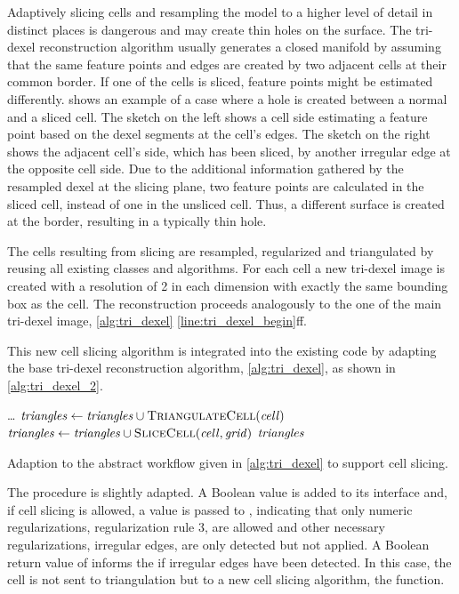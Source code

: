 Adaptively slicing cells and resampling the model to a higher level of detail in distinct places is dangerous and may create thin holes on the surface.
The tri-dexel reconstruction algorithm usually generates a closed manifold by assuming that the same feature points and edges are created by two adjacent cells at their common border.
If one of the cells is sliced, feature points might be estimated differently.
 shows an example of a case where a hole is created between a normal and a sliced cell.
The sketch on the left shows a cell side estimating a feature point based on the dexel segments at the cell's edges.
The sketch on the right shows the adjacent cell's side, which has been sliced, \eg by another irregular edge at the opposite cell side.
Due to the additional information gathered by the resampled dexel at the slicing plane, two feature points are calculated in the sliced cell, instead of one in the unsliced cell.
Thus, a different surface is created at the border, resulting in a typically thin hole.

The cells resulting from slicing are resampled, regularized and triangulated by reusing all existing classes and algorithms.
For each cell a new tri-dexel image is created with a resolution of 2 in each dimension with exactly the same bounding box as the cell.
The reconstruction proceeds analogously to the one of the main tri-dexel image, \cf \cref{alg:tri_dexel} \cref{line:tri_dexel_begin}ff.

This new cell slicing algorithm is integrated into the existing code by adapting the base tri-dexel reconstruction algorithm, \cref{alg:tri_dexel}, as shown in \cref{alg:tri_dexel_2}.
%
\begin{algorithm}
	\centering
	\begin{algorithmic}[1]
		\hfill\break
			\hspace*{\dimexpr\algorithmicindent*1}\dots
					\State $\var{triangles} \gets \var{triangles} \cup \Call{TriangulateCell}{\var{cell}}$
				\Else
					\State $\var{triangles} \gets \var{triangles} \cup \Call{SliceCell}{\var{cell}, \var{grid}}$
				\EndIf
			\EndFor
			\State \Return $\mathit{triangles}$
		\EndFunction
	\end{algorithmic}
	\caption{
		Adaption to the abstract workflow given in \cref{alg:tri_dexel} to support cell slicing.
	}
	\label{alg:tri_dexel_2}
\end{algorithm}
%
The  procedure is slightly adapted.
A Boolean value is added to its interface and, if cell slicing is allowed, a value \True is passed to , indicating that only numeric regularizations, \cf regularization rule 3, are allowed and other necessary regularizations, \ie irregular edges, are only detected but not applied.
A Boolean return value of  informs the if irregular edges have been detected.
In this case, the cell is not sent to triangulation but to a new cell slicing algorithm, the  function.

